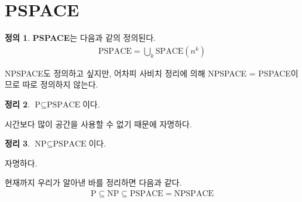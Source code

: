 \documentclass[b5paper, 11pt]{book}
\theoremstyle{definition}
\newtheorem{defn}{정의}[chapter]
\newtheorem{thm}[defn]{정리}
\newenvironment{pf*}{\pushQED{\qed}\pf}
{\popQED\endpf}
\begin{document}
\section{PSPACE}
\begin{defn}
    \textbf{PSPACE}는 다음과 같의 정의된다.
    \begin{align*}
        \text{PSPACE} = \bigcup_k \text{SPACE}(n^k)
    \end{align*}
\end{defn}
NPSPACE도 정의하고 싶지만, 어차피 사비치 정리에 의해 NPSPACE = PSPACE이므로 따로 정의하지 않는다.
\begin{thm}
    $\text{P} \subseteq \text{PSPACE}$이다. 
\end{thm}
\begin{pf*}
    시간보다 많이 공간을 사용할 수 없기 때문에 자명하다.
\end{pf*}
\begin{thm}
    $\text{NP} \subseteq \text{PSPACE}$이다.
\end{thm}
\begin{pf*}
    자명하다.
\end{pf*}
현재까지 우리가 알아낸 바를 정리하면 다음과 같다.
\begin{align*}
    \text{P} \subseteq \text{NP} \subseteq \text{PSPACE} = \text{NPSPACE}
\end{align*}
\end{document}
